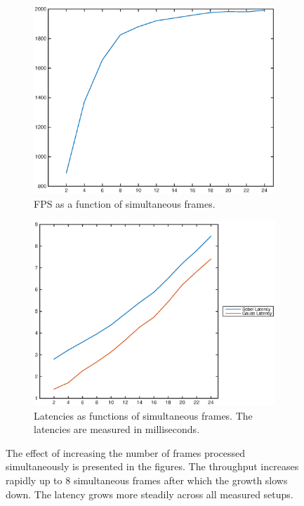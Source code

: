 \begin{figure}
    \centering
    \begin{subfigure}[t]{0.49\textwidth}
        \centering
        \includegraphics[width=0.99\linewidth]{images/simultaneous_frames_fps.eps}
        \caption{FPS as a function of simultaneous frames.}
        \label{fig:oeminitialframesfps}
    \end{subfigure}
    \begin{subfigure}[t]{0.49\textwidth}
        \centering
        \includegraphics[width=0.99\linewidth]{images/simultaneous_frames_latency.eps}
        \caption{Latencies as functions of simultaneous frames. The latencies are measured in milliseconds.}
        \label{fig:oeminitialframeslat}
    \end{subfigure}
    \caption{The effect of increasing the number of frames processed simultaneously is presented in the figures. The throughput increases rapidly up to 8 simultaneous frames after which the growth slows down. The latency grows more steadily across all measured setups.}
\end{figure}
